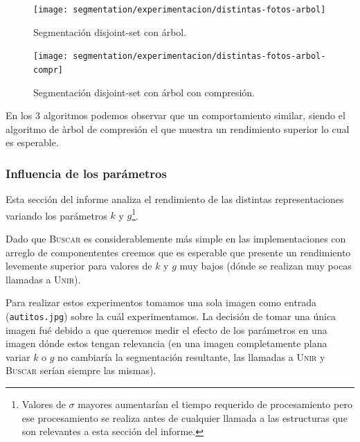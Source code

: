 \begin{figure}[H]
	\centering
	\texttt{[image: segmentation/experimentacion/distintas-fotos-arbol]}
	\caption{Segmentación disjoint-set con árbol.}
\end{figure}

\begin{figure}[H]
	\centering
	\texttt{[image: segmentation/experimentacion/distintas-fotos-arbol-compr]}
	\caption{Segmentación disjoint-set con árbol con compresión.}
\end{figure}

En los 3 algoritmos podemos observar que un comportamiento similar, siendo el algoritmo de àrbol de compresión el que muestra un rendimiento superior lo cual es esperable.

\subsubsection{Influencia de los parámetros}

Esta sección del informe analiza el rendimiento de las distintas
representaciones variando los parámetros $k$ y $g$\footnote{Valores de $\sigma$
mayores aumentarían el tiempo requerido de procesamiento pero ese procesamiento
se realiza antes de cualquier llamada a las estructuras que son relevantes a
esta sección del informe.}.

Dado que \textsc{Buscar} es considerablemente más simple en las
implementaciones con arreglo de componententes creemos que es esperable que
presente un rendimiento levemente superior para valores de $k$ y $g$ muy bajos
(dónde se realizan muy pocas llamadas a \textsc{Unir}).

Para realizar estos experimentos tomamos una sola imagen como entrada
(\texttt{autitos.jpg}) sobre la cuál experimentamos. La decisión de tomar una
única imagen fué debido a que queremos medir el efecto de los parámetros en una
imagen dónde estos tengan relevancia (en una imagen completamente plana variar
$k$ o $g$ no cambiaría la segmentación resultante, las llamadas a \textsc{Unir}
y \textsc{Buscar} serían siempre las mismas).

